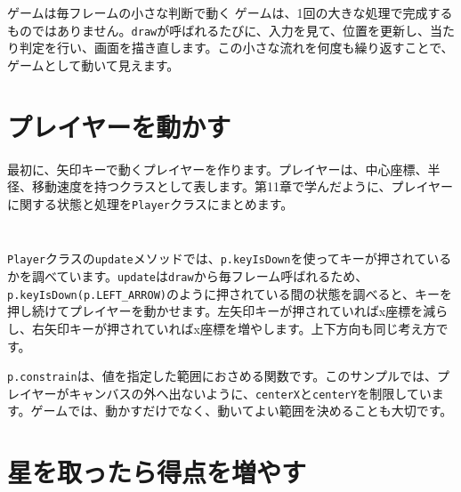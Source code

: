 \begin{pointbox}{ゲームは毎フレームの小さな判断で動く}
ゲームは、1回の大きな処理で完成するものではありません。\texttt{draw}が呼ばれるたびに、入力を見て、位置を更新し、当たり判定を行い、画面を描き直します。この小さな流れを何度も繰り返すことで、ゲームとして動いて見えます。
\end{pointbox}

\section{プレイヤーを動かす}

最初に、矢印キーで動くプレイヤーを作ります。プレイヤーは、中心座標、半径、移動速度を持つクラスとして表します。第11章で学んだように、プレイヤーに関する状態と処理を\texttt{Player}クラスにまとめます。

\begin{listing}[htbp]
\inputminted[firstline=1,lastline=44]{ts}{typescript-p5/listings/chapter15/player-control.ts}
\caption{矢印キーで動く\texttt{Player}クラス（\texttt{chapter15/player-control.ts}）}
\label{lst:chapter15-player-control-class}
\end{listing}

\begin{listing}[htbp]
\inputminted[firstline=46,lastline=62]{ts}{typescript-p5/listings/chapter15/player-control.ts}
\caption{\texttt{Player}クラスを使うスケッチ（\texttt{chapter15/player-control.ts}）}
\label{lst:chapter15-player-control-sketch}
\end{listing}

\texttt{Player}クラスの\texttt{update}メソッドでは、\texttt{p.keyIsDown}を使ってキーが押されているかを調べています。\texttt{update}は\texttt{draw}から毎フレーム呼ばれるため、\texttt{p.keyIsDown(p.LEFT\_ARROW)}のように押されている間の状態を調べると、キーを押し続けてプレイヤーを動かせます。左矢印キーが押されていればx座標を減らし、右矢印キーが押されていればx座標を増やします。上下方向も同じ考え方です。

\texttt{p.constrain}は、値を指定した範囲におさめる関数です。このサンプルでは、プレイヤーがキャンバスの外へ出ないように、\texttt{centerX}と\texttt{centerY}を制限しています。ゲームでは、動かすだけでなく、動いてよい範囲を決めることも大切です。

\section{星を取ったら得点を増やす}

